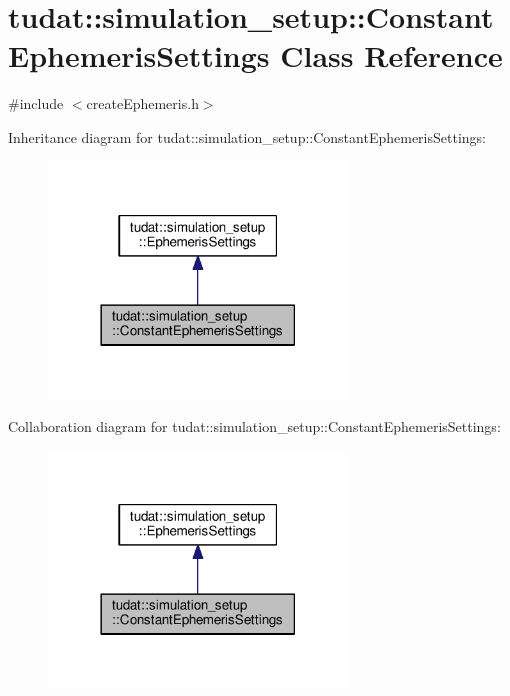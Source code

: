 \hypertarget{classtudat_1_1simulation__setup_1_1ConstantEphemerisSettings}{}\section{tudat\+:\+:simulation\+\_\+setup\+:\+:Constant\+Ephemeris\+Settings Class Reference}
\label{classtudat_1_1simulation__setup_1_1ConstantEphemerisSettings}


{\ttfamily \#include $<$create\+Ephemeris.\+h$>$}



Inheritance diagram for tudat\+:\+:simulation\+\_\+setup\+:\+:Constant\+Ephemeris\+Settings\+:
\nopagebreak
\begin{figure}[H]
\begin{center}
\leavevmode
\includegraphics[width=225pt]{classtudat_1_1simulation__setup_1_1ConstantEphemerisSettings__inherit__graph}
\end{center}
\end{figure}


Collaboration diagram for tudat\+:\+:simulation\+\_\+setup\+:\+:Constant\+Ephemeris\+Settings\+:
\nopagebreak
\begin{figure}[H]
\begin{center}
\leavevmode
\includegraphics[width=225pt]{classtudat_1_1simulation__setup_1_1ConstantEphemerisSettings__coll__graph}
\end{center}
\end{figure}
